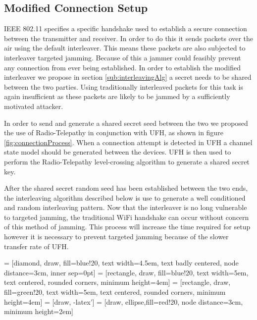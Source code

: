 \documentclass[sigconf, anonymous]{acmart}
\begin{document}
\subsection{Modified Connection Setup}
\label{sub:setup}

IEEE 802.11 specifies a specific handshake used to establish a secure connection between the transmitter and receiver. In order to do this it sends packets over the air using the default interleaver\cite{cooklev2004wireless}. This means these packets are also subjected to interleaver targeted jamming. Because of this a jammer could feasibly prevent any connection from ever being established. In order to establish the modified interleaver we propose in section \ref{sub:interleavingAlg} a secret needs to be shared between the two parties. Using traditionally interleaved packets for this task is again insufficient as these packets are likely to be jammed by a sufficiently motivated attacker. 

In order to send and generate a shared secret seed between the two we proposed the use of Radio-Telepathy in conjunction with UFH, as shown in figure \ref{fig:connectionProcess}. When a connection attempt is detected in UFH a channel state model should be generated between the devices. UFH is then used to perform the Radio-Telepathy level-crossing algorithm to generate a shared secret key.

After the shared secret random seed has been established between the two ends, the interleaving algorithm described below is use to generate a well conditioned and random interleaving pattern. Now that the interleaver is no long vulnerable to targeted jamming, the traditional WiFi handshake can occur without concern of this method of jamming. This process will increase the time required for setup however it is necessary to prevent targeted jamming because of the slower transfer rate of UFH\cite{strasser2008jamming}.

 = [diamond, draw, fill=blue!20, 
    text width=4.5em, text badly centered, node distance=3cm, inner sep=0pt]
 = [rectangle, draw, fill=blue!20, 
    text width=5em, text centered, rounded corners, minimum height=4em]
 = [rectangle, draw, fill=green!20, 
    text width=5em, text centered, rounded corners, minimum height=4em]
 = [draw, -latex']
 = [draw, ellipse,fill=red!20, node distance=3cm,
    minimum height=2em]
\end{document}
